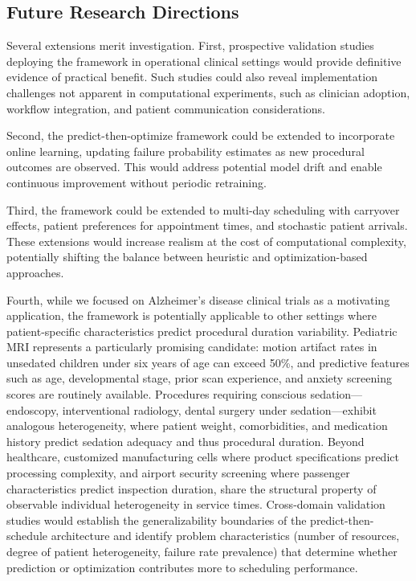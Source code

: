 \documentclass[11pt,a4paper]{article}
\begin{document}
\subsection{Future Research Directions}
\label{sec:future}

Several extensions merit investigation. First, prospective validation studies deploying the framework in operational clinical settings would provide definitive evidence of practical benefit. Such studies could also reveal implementation challenges not apparent in computational experiments, such as clinician adoption, workflow integration, and patient communication considerations.

Second, the predict-then-optimize framework could be extended to incorporate online learning, updating failure probability estimates as new procedural outcomes are observed. This would address potential model drift and enable continuous improvement without periodic retraining.

Third, the framework could be extended to multi-day scheduling with carryover effects, patient preferences for appointment times, and stochastic patient arrivals. These extensions would increase realism at the cost of computational complexity, potentially shifting the balance between heuristic and optimization-based approaches.

Fourth, while we focused on Alzheimer's disease clinical trials as a motivating application, the framework is potentially applicable to other settings where patient-specific characteristics predict procedural duration variability. Pediatric MRI represents a particularly promising candidate: motion artifact rates in unsedated children under six years of age can exceed 50\%, and predictive features such as age, developmental stage, prior scan experience, and anxiety screening scores are routinely available. Procedures requiring conscious sedation---endoscopy, interventional radiology, dental surgery under sedation---exhibit analogous heterogeneity, where patient weight, comorbidities, and medication history predict sedation adequacy and thus procedural duration. Beyond healthcare, customized manufacturing cells where product specifications predict processing complexity, and airport security screening where passenger characteristics predict inspection duration, share the structural property of observable individual heterogeneity in service times. Cross-domain validation studies would establish the generalizability boundaries of the predict-then-schedule architecture and identify problem characteristics (number of resources, degree of patient heterogeneity, failure rate prevalence) that determine whether prediction or optimization contributes more to scheduling performance.
\end{document}
